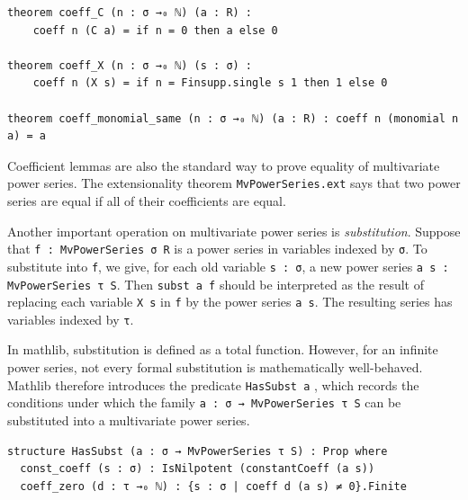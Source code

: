 \begin{lstlisting}
theorem coeff_C (n : σ →₀ ℕ) (a : R) :
    coeff n (C a) = if n = 0 then a else 0

theorem coeff_X (n : σ →₀ ℕ) (s : σ) :
    coeff n (X s) = if n = Finsupp.single s 1 then 1 else 0

theorem coeff_monomial_same (n : σ →₀ ℕ) (a : R) : coeff n (monomial n a) = a
\end{lstlisting}

Coefficient lemmas are also the standard way to prove equality
of multivariate power series.  The extensionality theorem
\lstinline|MvPowerSeries.ext|
\href{https://leanprover-community.github.io/mathlib4_docs/Mathlib/RingTheory/MvPowerSeries/Basic.html#MvPowerSeries.ext}{\faExternalLink}
says that two power series are equal if all
of their coefficients are equal.



Another important operation on multivariate power series is \emph{substitution}.  Suppose that \lstinline|f : MvPowerSeries σ R| is a power
series in variables indexed by \lstinline|σ|.  To substitute into
\lstinline|f|, we give, for each old variable \lstinline|s : σ|, a new
power series \lstinline|a s : MvPowerSeries τ S|.  Then
\lstinline|subst a f| should be interpreted as the result of replacing
each variable \lstinline|X s| in \lstinline|f| by the power series
\lstinline|a s|.  The resulting series has variables indexed by
\lstinline|τ|.

In mathlib, substitution is defined as a total function.  However, for an
infinite power series, not every formal substitution is mathematically
well-behaved.  Mathlib therefore introduces the predicate
\lstinline|HasSubst a|
\href{https://leanprover-community.github.io/mathlib4_docs/Mathlib/RingTheory/MvPowerSeries/Substitution.html#MvPowerSeries.HasSubst}{\faExternalLink}
, which records the conditions under which the
family \lstinline|a : σ → MvPowerSeries τ S| can be substituted into a
multivariate power series.

\begin{lstlisting}
structure HasSubst (a : σ → MvPowerSeries τ S) : Prop where
  const_coeff (s : σ) : IsNilpotent (constantCoeff (a s))
  coeff_zero (d : τ →₀ ℕ) : {s : σ | coeff d (a s) ≠ 0}.Finite
\end{lstlisting}

